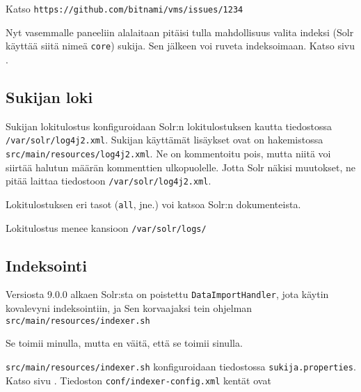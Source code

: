 \documentclass[12pt]{article}
\begin{document}
Katso \verb|https://github.com/bitnami/vms/issues/1234|


Nyt vasemmalle paneeliin alalaitaan pitäisi tulla mahdollisuus valita
indeksi (Solr käyttää siitä nimeä \verb=core=) sukija. Sen jälkeen voi
ruveta indeksoimaan. Katso sivu .


\subsection*{Sukijan loki}

Sukijan lokitulostus konfiguroidaan Solr:n lokitulostuksen kautta
tiedostossa \verb=/var/solr/log4j2.xml=. Sukijan käyttämät lisäykset
ovat on hakemistossa \verb=src/main/resources/log4j2.xml=. Ne on
kommentoitu pois, mutta niitä voi siirtää halutun määrän kommenttien
ulkopuolelle. Jotta Solr näkisi muutokset, ne pitää laittaa tiedostoon
\verb=/var/solr/log4j2.xml=.

Lokitulostuksen eri tasot (\verb=all=, jne.) voi katsoa Solr:n
dokumenteista.

Lokitulostus menee kansioon \verb=/var/solr/logs/=


\newpage
\subsection*{Indeksointi}

Versiosta 9.0.0 alkaen Solr:sta on poistettu \verb=DataImportHandler=,
jota käytin kovalevyni indeksointiin, ja Sen korvaajaksi tein ohjelman
\verb=src/main/resources/indexer.sh=

Se toimii minulla, mutta en väitä, että se toimii sinulla.

\verb=src/main/resources/indexer.sh= konfiguroidaan tiedostossa
\verb|sukija.properties|. Katso sivu .
Tiedoston \verb=conf/indexer-config.xml= kentät ovat
\end{document}
